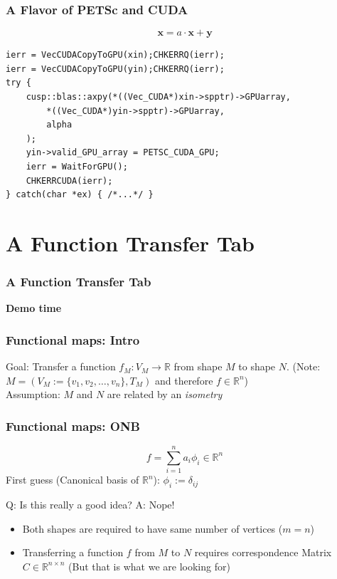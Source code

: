 \documentclass[compress]{beamer}
\begin{document}
\begin{frame}[fragile]
\frametitle{A Flavor of PETSc and CUDA}
$$
	\mathbf{x} = a \cdot \mathbf{x} + \mathbf{y}
$$
\begin{lstlisting}
ierr = VecCUDACopyToGPU(xin);CHKERRQ(ierr);
ierr = VecCUDACopyToGPU(yin);CHKERRQ(ierr);
try {
    cusp::blas::axpy(*((Vec_CUDA*)xin->spptr)->GPUarray,
        *((Vec_CUDA*)yin->spptr)->GPUarray,
        alpha
    );
    yin->valid_GPU_array = PETSC_CUDA_GPU;
    ierr = WaitForGPU();
    CHKERRCUDA(ierr);
} catch(char *ex) { /*...*/ }
\end{lstlisting}

\end{frame}

\section{A Function Transfer Tab}
\begin{frame}[fragile]
\frametitle{A Function Transfer Tab}
\bf{Demo time}
\end{frame}

\begin{frame}
\frametitle{Functional maps: Intro}
Goal: Transfer a function $f_M:V_M \to \mathbb{R}$ from shape $M$ to shape $N$. (Note: $M = (V_M:=\{v_1, v_2, \dots, v_n\}, T_M)$ and therefore $f \in \mathbb{R}^n$)\\
Assumption: $M$ and $N$ are related by an \emph{isometry}
\end{frame}

\begin{frame}[fragile]
\frametitle{Functional maps: ONB}
$$
	f = \sum_{i=1}^{n} a_i\phi_i \in \mathbb{R}^n
$$
First guess (Canonical basis of $\mathbb{R}^n$): $\phi_i := \delta_{ij}$ \\

\begin{block}{}
Q: Is this really a good idea? A: Nope!
\begin{itemize}
	\item Both shapes are required to have same number of vertices ($m=n$)
	\item Transferring a function $f$ from $M$ to $N$ requires correspondence Matrix $C\in \mathbb{R}^{n \times n}$ (But that is what we are looking for)
\end{itemize}
\end{block}
\end{frame}
\end{document}
